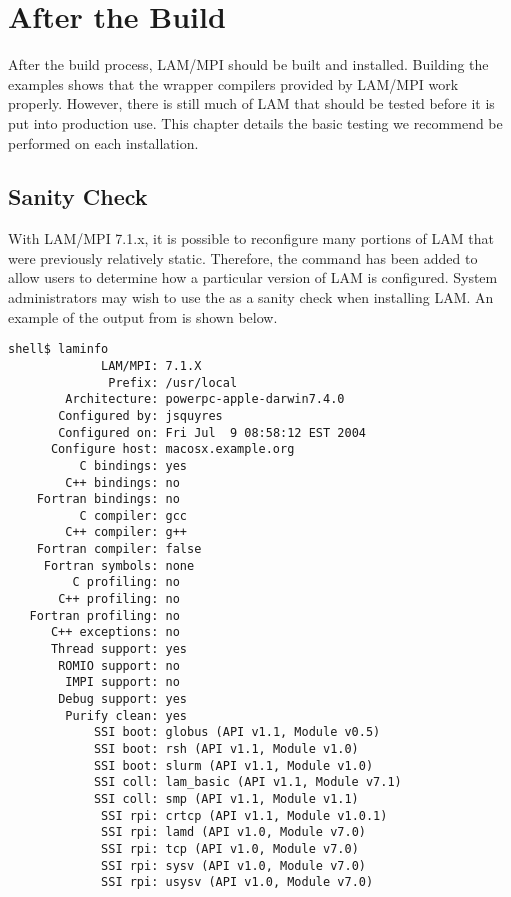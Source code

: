 %
% 
%
%

\chapter{After the Build}
\label{sec:postbuild}

After the build process, LAM/MPI should be built and installed.
Building the examples shows that the wrapper compilers provided by
LAM/MPI work properly.  However, there is still much of LAM that
should be tested before it is put into production use.  This chapter
details the basic testing we recommend be performed on each
installation.

\section{Sanity Check}

With LAM/MPI 7.1.x, it is possible to reconfigure many portions of LAM
that were previously relatively static.  Therefore, the 
command has been added to allow users to determine how a particular
version of LAM is configured.  System administrators may wish to use
the  as a sanity check when installing LAM.  An example
of the output from  is shown below.

\lstset{style=lam-laminfo}
\begin{lstlisting}
shell$ laminfo
             LAM/MPI: 7.1.X
              Prefix: /usr/local
        Architecture: powerpc-apple-darwin7.4.0
       Configured by: jsquyres
       Configured on: Fri Jul  9 08:58:12 EST 2004
      Configure host: macosx.example.org
          C bindings: yes
        C++ bindings: no
    Fortran bindings: no
          C compiler: gcc
        C++ compiler: g++
    Fortran compiler: false
     Fortran symbols: none
         C profiling: no
       C++ profiling: no
   Fortran profiling: no
      C++ exceptions: no
      Thread support: yes
       ROMIO support: no
        IMPI support: no
       Debug support: yes
        Purify clean: yes
            SSI boot: globus (API v1.1, Module v0.5)
            SSI boot: rsh (API v1.1, Module v1.0)
            SSI boot: slurm (API v1.1, Module v1.0)
            SSI coll: lam_basic (API v1.1, Module v7.1)
            SSI coll: smp (API v1.1, Module v1.1)
             SSI rpi: crtcp (API v1.1, Module v1.0.1)
             SSI rpi: lamd (API v1.0, Module v7.0)
             SSI rpi: tcp (API v1.0, Module v7.0)
             SSI rpi: sysv (API v1.0, Module v7.0)
             SSI rpi: usysv (API v1.0, Module v7.0)
\end{lstlisting}

